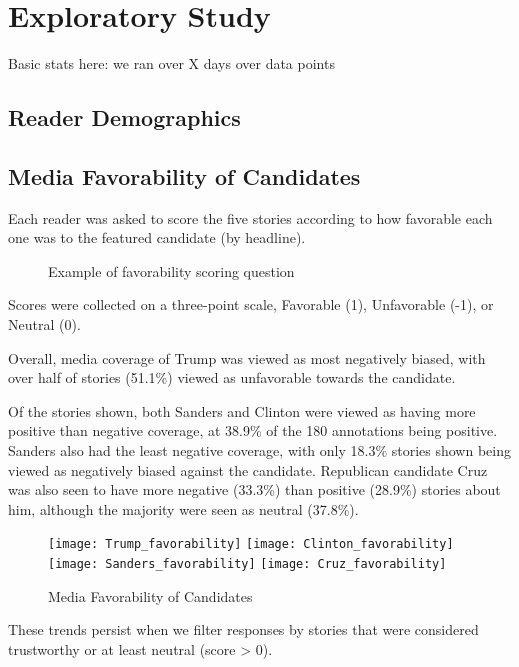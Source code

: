 \chapter{Exploratory Study}
Basic stats here:
we ran over X days
over data points

\section{Reader Demographics}

\section{Media Favorability of Candidates}
Each reader was asked to score the five stories according to how favorable each one was to the featured candidate (by headline). 

\begin{figure}[h!] 
\centering
  \caption{Example of favorability scoring question}
\end{figure}
 
Scores were collected on a three-point scale, Favorable (1), Unfavorable (-1), or Neutral (0).

Overall, media coverage of Trump was viewed as most negatively biased, with over half of stories (51.1\%) viewed as unfavorable towards the candidate.

Of the stories shown, both Sanders and Clinton were viewed as having more positive than negative coverage, at 38.9\% of the 180 annotations being positive. Sanders also had the least negative coverage, with only 18.3\% stories shown being viewed as negatively biased against the candidate. Republican candidate Cruz was also seen to have more negative (33.3\%) than positive (28.9\%) stories about him, although the majority were seen as neutral (37.8\%).

\begin{figure}[h!] 
\centering
  \texttt{[image: Trump\_favorability]} 
  \texttt{[image: Clinton\_favorability]} 
  \texttt{[image: Sanders\_favorability]} 
  \texttt{[image: Cruz\_favorability]} 
  \caption{Media Favorability of Candidates}
\end{figure}

These trends persist when we filter responses by stories that were considered trustworthy or at least neutral (score > 0).

